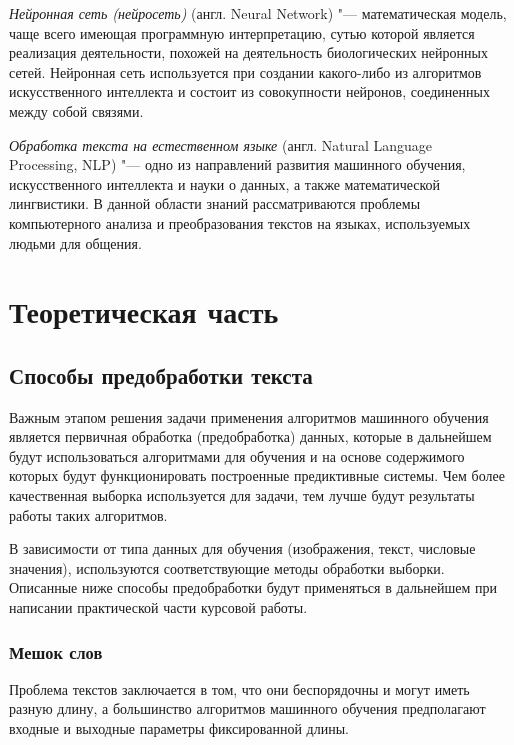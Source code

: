 \documentclass[bachelor, och, coursework]{SCWorks}
\begin{document}
    \textit{Нейронная сеть (нейросеть)} (англ. Neural Network) "---
    математическая модель, чаще всего имеющая программную интерпретацию, сутью
    которой является реализация деятельности, похожей на деятельность
    биологических нейронных сетей. Нейронная сеть используется при создании
    какого-либо из алгоритмов искусственного интеллекта и состоит из
    совокупности нейронов, соединенных между собой связями. 

    \textit{Обработка текста на естественном языке} (англ. Natural Language\\
    Processing, NLP) "--- одно из направлений развития машинного обучения,
    искусственного интеллекта и науки о данных, а также математической
    лингвистики. В данной области знаний рассматриваются проблемы компьютерного
    анализа и преобразования текстов на языках, используемых людьми для общения.


\section{Теоретическая часть}

    \subsection{Способы предобработки текста}

        Важным этапом решения задачи применения алгоритмов машинного обучения
        является первичная обработка (предобработка) данных, которые в
        дальнейшем будут использоваться алгоритмами для обучения и на основе
        содержимого которых будут функционировать построенные предиктивные
        системы. Чем более качественная выборка используется для задачи, тем
        лучше будут результаты работы таких алгоритмов.

        В зависимости от типа данных для обучения (изображения, текст, числовые
        значения), используются соответствующие методы обработки выборки.
        Описанные ниже способы предобработки будут применяться в дальнейшем при
        написании практической части курсовой работы.

        \subsubsection{Мешок слов}

            Проблема текстов заключается в том, что они беспорядочны и могут
            иметь разную длину, а большинство алгоритмов машинного обучения
            предполагают входные и выходные параметры фиксированной длины.
\end{document}
